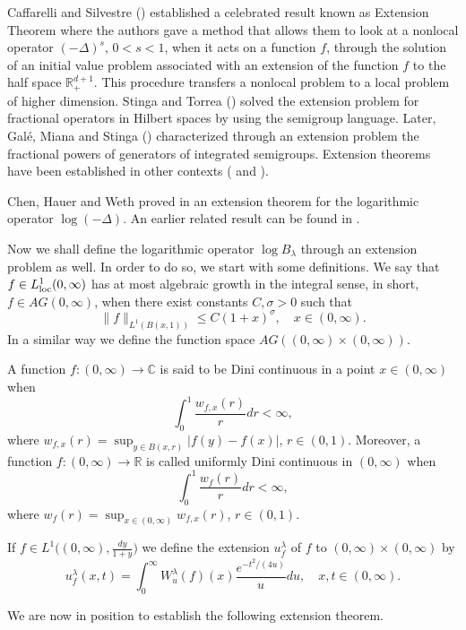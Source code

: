 \documentclass[a4paper,10pt, reqno]{amsart}
\theoremstyle{definition}
\theoremstyle{remark}
\numberwithin{equation}{section}
\begin{document}
Caffarelli and Silvestre (\cite{CaSi}) established a celebrated result known as Extension Theorem where the authors gave a method that allows them to look at a nonlocal operator $(-\Delta )^s$, $0<s<1$, when it acts on a function $f$, through the solution of an initial value problem associated with an extension of the function $f$ to the half space $\mathbb R_+^{d+1}$. This procedure transfers a nonlocal problem to a local problem of higher dimension. Stinga and Torrea (\cite{ST}) solved the extension problem for fractional operators in Hilbert spaces by using the semigroup language. Later, Gal\'e, Miana and Stinga (\cite{GMS}) characterized through an extension problem the fractional powers of generators of integrated semigroups. Extension theorems have been established in other contexts (\cite{AEW, AH, BGS, BP} and \cite{KM}).

Chen, Hauer and Weth proved in \cite[Theorem 1.2]{ChHW} an extension theorem for the logarithmic operator $\log(-\Delta)$. An earlier related result can be found in \cite{GoSp}.

Now we shall define the logarithmic operator $\log B_\lambda$ through an extension problem as well. In order to do so, we start with some definitions. We say that $f\in L_{\rm loc}^1(0,\infty)$ has at most algebraic growth in the integral sense, in short, $f\in AG(0,\infty)$, when there exist constants $C,\sigma >0$ such that
\[
\|f\|_{L^1(B(x,1))}\leq C(1+x)^\sigma ,\quad x\in (0,\infty).
\]
In a similar way we define the function space $AG((0,\infty)\times (0,\infty))$.

A function $f:(0,\infty)\to \mathbb C$ is said to be Dini continuous in a point $x\in (0,\infty)$ when 
\[
\int_0^1\frac{w_{f,x}(r)}{r}dr<\infty,
\]
where $w_{f,x}(r)=\sup_{y \in B(x,r)}|f(y)-f(x)|$, $r\in (0,1)$. Moreover, a function $f:(0,\infty)\to \mathbb R$ is called uniformly Dini continuous in $(0,\infty)$ when 
\[
\int_0^1\frac{w_f(r)}{r}dr<\infty,
\]
where $w_f(r)=\sup_{x\in (0,\infty)}w_{f,x}(r)$, $r\in (0,1)$.

If $f\in L^1\big((0,\infty),\frac{dy}{1+y}\big)$ we define the extension $u_f^\lambda$ of $f$ to $(0,\infty)\times (0,\infty)$ by
\[
u_f^\lambda(x,t)=\int_0^\infty W_u^\lambda (f)(x)\frac{e^{-t^2/(4u)}}{u}du,\quad x,t\in (0,\infty).
\]

We are now in position to establish the following extension theorem.
\end{document}
